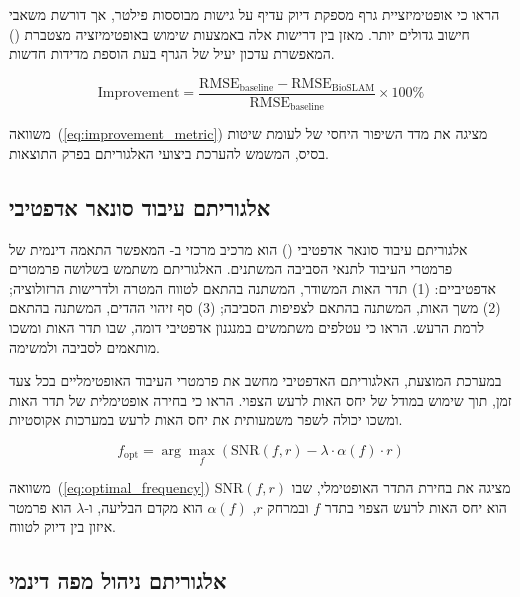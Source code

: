 \citet{Grisetti2010g2o} הראו כי אופטימיזציית גרף מספקת דיוק עדיף על גישות מבוססות פילטר, אך דורשת משאבי חישוב גדולים יותר.  מאזן בין דרישות אלה באמצעות שימוש באופטימיזציה מצטברת () המאפשרת עדכון יעיל של הגרף בעת הוספת מדידות חדשות.

\begin{equation}
\text{Improvement} = \frac{\text{RMSE}_{\text{baseline}} - \text{RMSE}_{\text{BioSLAM}}}{\text{RMSE}_{\text{baseline}}} \times 100\%
\label{eq:improvement_metric}
\end{equation}

משוואה~(\ref{eq:improvement_metric}) מציגה את מדד השיפור היחסי של  לעומת שיטות בסיס, המשמש להערכת ביצועי האלגוריתם בפרק התוצאות.

\subsection{אלגוריתם עיבוד סונאר אדפטיבי}
\label{sec:adaptive_sonar_processing}

אלגוריתם עיבוד סונאר אדפטיבי () הוא מרכיב מרכזי ב- המאפשר התאמה דינמית של פרמטרי העיבוד לתנאי הסביבה המשתנים. האלגוריתם משתמש בשלושה פרמטרים אדפטיביים: (1) תדר האות המשודר, המשתנה בהתאם לטווח המטרה ולדרישות הרזולוציה; (2) משך האות, המשתנה בהתאם לצפיפות הסביבה; (3) סף זיהוי ההדים, המשתנה בהתאם לרמת הרעש. \citet{GriffithBatEcholocation} הראו כי עטלפים משתמשים במנגנון אדפטיבי דומה, שבו תדר האות ומשכו מותאמים לסביבה ולמשימה.

במערכת המוצעת, האלגוריתם האדפטיבי מחשב את פרמטרי העיבוד האופטימליים בכל צעד זמן, תוך שימוש במודל של יחס האות לרעש הצפוי. \citet{Rihaczek1969MatchedFilter} הראו כי בחירה אופטימלית של תדר האות ומשכו יכולה לשפר משמעותית את יחס האות לרעש במערכות אקוסטיות.

\begin{equation}
f_{\text{opt}} = \arg\max_{f} \left( \text{SNR}(f, r) - \lambda \cdot \alpha(f) \cdot r \right)
\label{eq:optimal_frequency}
\end{equation}

משוואה~(\ref{eq:optimal_frequency}) מציגה את בחירת התדר האופטימלי, שבו $\text{SNR}(f, r)$ הוא יחס האות לרעש הצפוי בתדר $f$ ובמרחק $r$, $\alpha(f)$ הוא מקדם הבליעה, ו-$\lambda$ הוא פרמטר איזון בין דיוק לטווח.

\subsection{אלגוריתם ניהול מפה דינמי}
\label{sec:dynamic_map_management}


